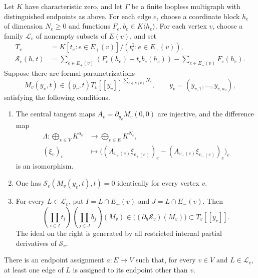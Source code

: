 \begin{theorem}\label{ten:assignment}
Let \(K\) have characteristic zero, and let \(\Gamma\) be a finite
loopless multigraph with distinguished endpoints as above.  For each edge
\(e\), choose a coordinate block \(h_e\) of dimension \(N_e\geq0\) and
functions \(F_e,b_e\in K\langle h_e\rangle\).  For each vertex \(v\),
choose a family \(\mathcal L_v\) of nonempty subsets of \(E(v)\), and set
\begin{align}
 T_v&=K[t_e:e\in E_+(v)]/(t_e^2:e\in E_+(v)),\label{ten:parameters}\\
 \mathcal S_v(h,t)
 &=\sum_{e\in E_+(v)}(F_e(h_e)+t_e b_e(h_e))
       -\sum_{e\in E_-(v)}F_e(h_e).\label{ten:vertex-potential}
\end{align}
Suppose there are formal parametrizations
\[
 M_v(y_v,t)\in (y_v,t)T_v[[y_v]]^{\sum_{e\in E(v)}N_e},
 \qquad y_v=(y_{v,1},\ldots,y_{v,a_v}),
\]
satisfying the following conditions.
\begin{enumerate}
 \item The central tangent maps \(A_v=\partial_{y_v}M_v(0,0)\) are
 injective, and the difference map
 \begin{equation}\label{ten:transversality}
 \begin{split}
 \Lambda:\bigoplus_{v\in V}K^{a_v}&\longrightarrow
                         \bigoplus_{e\in E}K^{N_e},\\
 (\xi_v)_v&\longmapsto
 \bigl((A_{v_+(e)}\xi_{v_+(e)})_e
             -(A_{v_-(e)}\xi_{v_-(e)})_e\bigr)_e
 \end{split}
 \end{equation}
 is an isomorphism.
 \item One has \(\mathcal S_v(M_v(y_v,t),t)=0\) identically for every
 vertex \(v\).
 \item For every \(L\in\mathcal L_v\), put
 \(I=L\cap E_+(v)\) and \(J=L\cap E_-(v)\).  Then
 \begin{equation}\label{ten:law-membership}
 \left(\prod_{i\in I}t_i\right)
 \left(\prod_{j\in J}b_j\right)(M_v)
 \in
 \bigl((\partial_h\mathcal S_v)(M_v)\bigr)
                         \subset T_v[[y_v]].
 \end{equation}
 The ideal on the right is generated by all restricted internal
 partial derivatives of \(\mathcal S_v\).
\end{enumerate}
There is an endpoint assignment \(a:E\to V\) such that, for every
\(v\in V\) and \(L\in\mathcal L_v\), at least one edge of \(L\) is
assigned to its endpoint other than \(v\).
\end{theorem}

